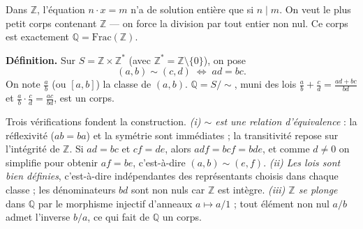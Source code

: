 ﻿%



Dans $\mathbb{Z}$, l'équation $n \cdot x = m$ n'a de solution entière que
si $n \mid m$. On veut le plus petit corps contenant $\mathbb{Z}$ — on force
la division par tout entier non nul. Ce corps est exactement
$\mathbb{Q} = \mathrm{Frac}(\mathbb{Z})$.

\begin{tcolorbox}[thmbox]
  \textbf{Définition.}\enspace%
  Sur $S = \mathbb{Z} \times \mathbb{Z}^*$ (avec $\mathbb{Z}^* = \mathbb{Z}\setminus\{0\}$),
  on pose
  \[
    (a,b) \sim (c,d) \;\iff\; ad = bc.
  \]
  On note $\tfrac{a}{b}$ (ou $[a,b]$) la classe de $(a,b)$.
  $\mathbb{Q} = S/{\sim}$, muni des lois $\tfrac{a}{b}+\tfrac{c}{d}=\tfrac{ad+bc}{bd}$
  et $\tfrac{a}{b}\cdot\tfrac{c}{d}=\tfrac{ac}{bd}$, est un corps.
\end{tcolorbox}

\begin{ideepreuve}
  Trois vérifications fondent la construction.
  \emph{(i) $\sim$ est une relation d'équivalence} : la réflexivité ($ab=ba$)
  et la symétrie sont immédiates ; la transitivité repose sur l'intégrité de
  $\mathbb{Z}$. Si $ad=bc$ et $cf=de$, alors $adf=bcf=bde$, et comme $d\neq 0$
  on simplifie pour obtenir $af=be$, c'est-à-dire $(a,b)\sim(e,f)$.
  \emph{(ii) Les lois sont bien définies}, c'est-à-dire indépendantes des
  représentants choisis dans chaque classe ; les dénominateurs $bd$ sont non
  nuls car $\mathbb{Z}$ est intègre.
  \emph{(iii) $\mathbb{Z}$ se plonge} dans $\mathbb{Q}$ par le morphisme injectif
  d'anneaux $a\mapsto a/1$ ; tout élément non nul $a/b$ admet l'inverse $b/a$,
  ce qui fait de $\mathbb{Q}$ un corps.
\end{ideepreuve}

\decsep{}


